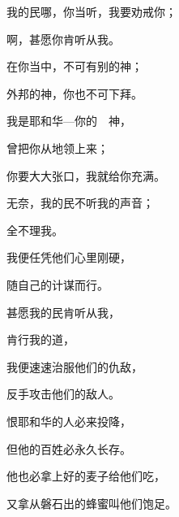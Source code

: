 {\Q {}我的民哪，你当听，我要劝戒你；
\par }{啊，甚愿你肯听从我。
\par }{\Q {}在你当中，不可有别的神；
\par }{\Q 外邦的神，你也不可下拜。
\par }{\Q {}我是耶和华—你的　神，
\par }{\Q 曾把你从{}地领上来；
\par }{\Q 你要大大张口，我就给你充满。
\par }{\BB \par }{\Q {}无奈，我的民不听我的声音；
\par }{全不理我。
\par }{\Q {}我便任凭他们心里刚硬，
\par }{\Q 随自己的计谋而行。
\par }{\Q {}甚愿我的民肯听从我，
\par }{肯行我的道，
\par }{\Q {}我便速速治服他们的仇敌，
\par }{\Q 反手攻击他们的敌人。
\par }{\Q {}恨耶和华的人必来投降，
\par }{\Q 但他的百姓必永久长存。
\par }{\Q {}他也必拿上好的麦子给他们吃，
\par }{\Q 又拿从磐石出的蜂蜜叫他们饱足。

\par }
